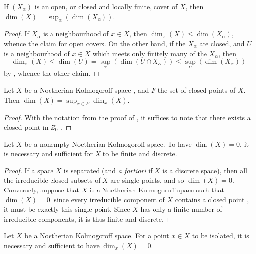 \begin{corollary}[14.1.7]
\label{0.14.1.7}
If $(X_\alpha)$ is an open, or closed and locally finite, cover of $X$, then $\dim(X)=\sup_\alpha(\dim(X_\alpha))$.
\end{corollary}

\begin{proof}
If $X_\alpha$ is a neighbourhood of $x\in X$, then $\dim_x(X)\leq\dim(X_\alpha)$, whence the claim for open covers.
On the other hand, if the $X_\alpha$ are closed, and $U$ is a neighbourhood of $x\in X$ which meets only finitely many of the $X_\alpha$, then
\[
  \dim_x(X)\leq\dim(U)=\sup_\alpha(\dim(U\cap X_\alpha))\leq\sup_\alpha(\dim(X_\alpha))
\]
by , whence the other claim.
\end{proof}

\begin{corollary}[14.1.8]
\label{0.14.1.8}
Let $X$ be a Noetherian Kolmogoroff space , and $F$ the set of closed points of $X$.
Then $\dim(X)=\sup_{x\in F}\dim_x(X)$.
\end{corollary}

\begin{proof}
With the notation from the proof of , it suffices to note that there exists a closed point in $Z_0$ .
\end{proof}

\begin{proposition}[14.1.9]
\label{0.14.1.9}
Let $X$ be a nonempty Noetherian Kolmogoroff space.
To have $\dim(X)=0$, it is necessary and sufficient for $X$ to be finite and discrete.
\end{proposition}

\begin{proof}
If a space $X$ is separated (and \emph{a fortiori} if $X$ is a discrete space), then all the irreducible closed subsets of $X$ are single points, and so $\dim(X)=0$.
Conversely, suppose that $X$ is a Noetherian Kolmogoroff space such that $\dim(X)=0$;
since every irreducible component of $X$ contains a closed point , it must be exactly this single point.
Since $X$ has only a finite number of irreducible components, it is thus finite and discrete.
\end{proof}

\begin{corollary}[14.1.10]
\label{0.14.1.10}
Let $X$ be a Noetherian Kolmogoroff space.
For a point $x\in X$ to be isolated, it is necessary and sufficient to have $\dim_x(X)=0$.
\end{corollary}

